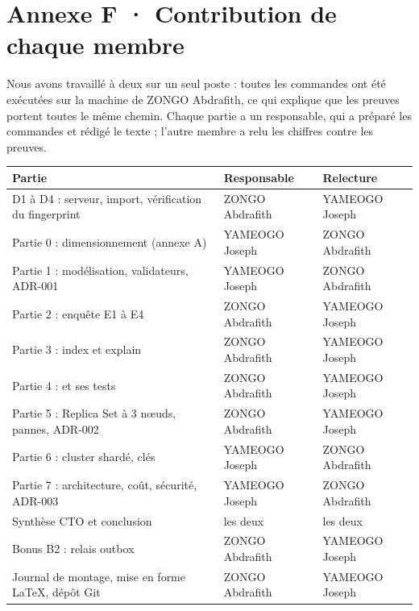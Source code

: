 \documentclass[11pt,a4paper]{article}
\newcommand{\code}[1]{\texttt{\detokenize{#1}}}
\begin{document}
	\section*{Annexe F · Contribution de chaque membre}
	Nous avons travaillé à deux sur un seul poste : toutes les commandes ont été exécutées sur la machine de ZONGO Abdrafith, ce qui explique que les preuves portent toutes le même chemin. Chaque partie a un responsable, qui a préparé les commandes et rédigé le texte ; l'autre membre a relu les chiffres contre les preuves.
	\begin{center}\small
		\begin{tabularx}{\linewidth}{@{}LP{3.4cm}P{3.4cm}@{}}
			\toprule
			\textbf{Partie} & \textbf{Responsable} & \textbf{Relecture} \\
			\midrule
			D1 à D4 : serveur, import, vérification du fingerprint & ZONGO Abdrafith & YAMEOGO Joseph \\
			Partie 0 : dimensionnement (annexe A) & YAMEOGO Joseph & ZONGO Abdrafith \\
			Partie 1 : modélisation, validateurs, ADR-001 & YAMEOGO Joseph & ZONGO Abdrafith \\
			Partie 2 : enquête E1 à E4 & ZONGO Abdrafith & YAMEOGO Joseph \\
			Partie 3 : index et explain & ZONGO Abdrafith & YAMEOGO Joseph \\
			Partie 4 : \code{transfer.js} et ses tests & ZONGO Abdrafith & YAMEOGO Joseph \\
			Partie 5 : Replica Set à 3 nœuds, pannes, ADR-002 & ZONGO Abdrafith & YAMEOGO Joseph \\
			Partie 6 : cluster shardé, clés & YAMEOGO Joseph & ZONGO Abdrafith \\
			Partie 7 : architecture, coût, sécurité, ADR-003 & YAMEOGO Joseph & ZONGO Abdrafith \\
			Synthèse CTO et conclusion & les deux & les deux \\
			Bonus B2 : relais outbox & ZONGO Abdrafith & YAMEOGO Joseph \\
			Journal de montage, mise en forme \LaTeX{}, dépôt Git & ZONGO Abdrafith & YAMEOGO Joseph \\
			\bottomrule
		\end{tabularx}
	\end{center}
	
	\clearpage
\end{document}
